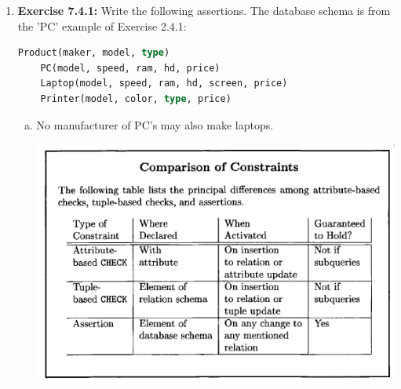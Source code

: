 \documentclass[12pt]{article}
\begin{document}
\begin{enumerate}[1.]
    \item \textbf{Exercise 7.4.1:} Write the following assertions. The database schema is from
    the 'PC' example of Exercise 2.4.1:


    \begin{lstlisting}[language=SQL]
    Product(maker, model, type)
    PC(model, speed, ram, hd, price)
    Laptop(model, speed, ram, hd, screen, price)
    Printer(model, color, type, price)
    \end{lstlisting}

    \bigskip

    \begin{enumerate}[a)]
        \item No manufacturer of PC's may also make laptops.

        \begin{center}
        \includegraphics[width=0.7\linewidth]{images/worksheet_5_1.png}
        \end{center}
    \end{enumerate}


\end{enumerate}
\end{document}
